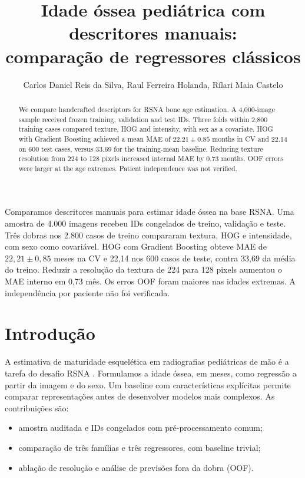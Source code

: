 \documentclass[12pt]{article}
\title{Idade óssea pediátrica com descritores manuais:\\comparação de regressores clássicos}
\author{Carlos Daniel Reis da Silva, Raul Ferreira Holanda, Rílari Maia Castelo}
\date{}
\begin{document}
\maketitle
\begin{resumo}
Comparamos descritores manuais para estimar idade óssea na base RSNA. Uma amostra de 4.000 imagens recebeu IDs congelados de treino, validação e teste. Três dobras nos 2.800 casos de treino compararam textura, HOG e intensidade, com sexo como covariável. HOG com Gradient Boosting obteve MAE de $22{,}21\pm0{,}85$ meses na CV e 22,14 nos 600 casos de teste, contra 33,69 da média do treino. Reduzir a resolução da textura de 224 para 128 pixels aumentou o MAE interno em 0,73 mês. Os erros OOF foram maiores nas idades extremas. A independência por paciente não foi verificada.
\end{resumo}
\begin{abstract}
We compare handcrafted descriptors for RSNA bone age estimation. A 4,000-image sample received frozen training, validation and test IDs. Three folds within 2,800 training cases compared texture, HOG and intensity, with sex as a covariate. HOG with Gradient Boosting achieved a mean MAE of $22.21\pm0.85$ months in CV and 22.14 on 600 test cases, versus 33.69 for the training-mean baseline. Reducing texture resolution from 224 to 128 pixels increased internal MAE by 0.73 months. OOF errors were larger at the age extremes. Patient independence was not verified.
\end{abstract}
\section{Introdução}
A estimativa de maturidade esquelética em radiografias pediátricas de mão é a tarefa do desafio RSNA \cite{halabi}. Formulamos a idade óssea, em meses, como regressão a partir da imagem e do sexo. Um baseline com características explícitas permite comparar representações antes de desenvolver modelos mais complexos. As contribuições são:
\begin{itemize}
\item amostra auditada e IDs congelados com pré-processamento comum;
\item comparação de três famílias e três regressores, com baseline trivial;
\item ablação de resolução e análise de previsões fora da dobra (OOF).
\end{itemize}
\end{document}
